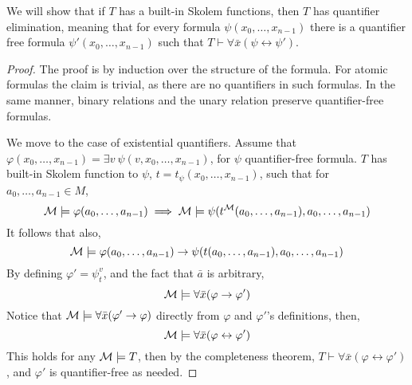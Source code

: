 \subquestion{}
We will show that if $T$ has a built-in Skolem functions, then $T$ has quantifier elimination,
meaning that for every formula $\psi(x_0, \ldots, x_{n - 1})$ there is a quantifier free formula $\psi'(x_0, \ldots, x_{n - 1})$ such that $T \vdash \forall \bar{x} (\psi \leftrightarrow \psi')$.
\begin{proof}
	The proof is by induction over the structure of the formula.
	For atomic formulas the claim is trivial, as there are no quantifiers in such formulas.
	In the same manner, binary relations and the unary relation preserve quantifier-free formulas.

	We move to the case of existential quantifiers.
	Assume that $\varphi(x_0, \ldots, x_{n - 1}) = \exists v\ \psi(v, x_0, \ldots, x_{n - 1})$, for $\psi$ quantifier-free formula.
	$T$ has built-in Skolem function to $\psi$, $t = t_{\psi}(x_0, \ldots, x_{n - 1})$, such that for $a_0, \ldots, a_{n - 1} \in M$,
	\[
		\mathcal{M} \models \varphi(a_0, \ldots, a_{n - 1})
		\implies \mathcal{M} \models \psi(t^{\mathcal{M}}(a_0, \ldots, a_{n - 1}), a_0, \ldots, a_{n - 1})
	\]
	It follows that also,
	\[
		\mathcal{M} \models \varphi(a_0, \ldots, a_{n - 1}) \to \psi(t(a_0, \ldots, a_{n - 1}), a_0, \ldots, a_{n - 1})
	\]
	By defining $\varphi' = \psi_t^v$, and the fact that $\bar{a}$ is arbitrary,
	\[
		\mathcal{M} \models \forall \bar{x} (\varphi \to \varphi')
	\]
	Notice that $\mathcal{M} \models \forall \bar{x} (\varphi' \to \varphi)$ directly from $\varphi$ and $\varphi'$'s definitions, then,
	\[
		\mathcal{M} \models \forall \bar{x} (\varphi \leftrightarrow \varphi')
	\]
	This holds for any $\mathcal{M} \models T$, then by the completeness theorem, $T \vdash \forall \bar{x} (\varphi \leftrightarrow \varphi')$, and $\varphi'$ is quantifier-free as needed.
\end{proof}

